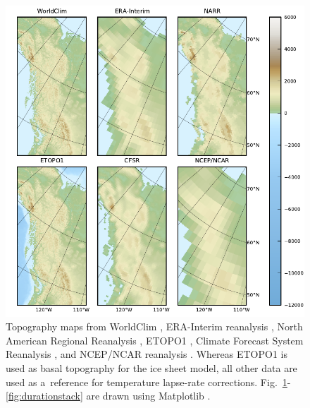 \documentclass[tc, ms]{copernicus}
\begin{document}
\begin{figure}[t]
	\vspace*{2mm}
	\begin{center}
		\includegraphics{cordillera-climate-topo}
	\end{center}
	\caption{Topography maps from WorldClim \citep{data:worldclim}, ERA-Interim reanalysis \citep{data:erai}, North American Regional Reanalysis \citep[NARR;][]{data:narr}, ETOPO1 \citep{data:etopo1}, Climate Forecast System Reanalysis \citep[CFSR;][]{data:cfsr}, and NCEP/NCAR reanalysis \citep{data:ncar}. Whereas ETOPO1 is used as basal topography for the ice sheet model, all other data are used as a~reference for temperature lapse-rate corrections. Fig.~\ref{fig:topo}-\ref{fig:durationstack} are drawn using Matplotlib \citep{soft:mpl}.}
	\label{fig:topo}
\end{figure}
\end{document}
